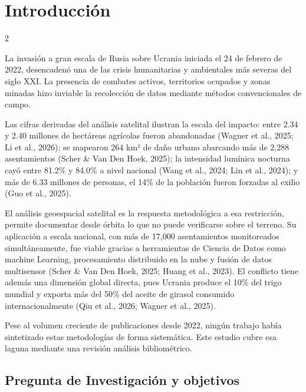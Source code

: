 \documentclass[12pt, a4paper]{article}
\begin{document}
\setcounter{page}{1}

\section{Introducción}

\begin{multicols}{2}

La invasión a gran escala de Rusia sobre Ucrania iniciada el 24 de febrero de 2022, desencadenó una de las crisis humanitarias y ambientales más severas del siglo XXI. La presencia de combates activos, territorios ocupados y zonas minadas hizo inviable la recolección de datos mediante métodos convencionales de campo.

Las cifras derivadas del análisis satelital ilustran la escala del impacto: entre 2.34 y 2.40 millones de hectáreas agrícolas fueron abandonadas (Wagner et al., 2025; Li et al., 2026); se mapearon 264 km² de daño urbano abarcando más de 2,288 asentamientos (Scher \& Van Den Hoek, 2025); la intensidad lumínica nocturna cayó entre 81.2\% y 84.0\% a nivel nacional (Wang et al., 2024; Lin et al., 2024); y más de 6.33 millones de personas, el 14\% de la población fueron forzadas al exilio (Guo et al., 2025).

El análisis geoespacial satelital es la respuesta metodológica a esa restricción, permite documentar desde órbita lo que no puede verificarse sobre el terreno. Su aplicación a escala nacional, con más de 17,000 asentamientos monitoreados simultáneamente, fue viable gracias a herramientas de Ciencia de Datos como  machine Learning, procesamiento distribuido en la nube y fusión de datos multisensor (Scher \& Van Den Hoek, 2025; Huang et al., 2023). El conflicto tiene además una dimensión global directa, pues Ucrania produce el 10\% del trigo mundial y exporta más del 50\% del aceite de girasol consumido internacionalmente (Qiu et al., 2026; Wagner et al., 2025).

Pese al volumen creciente de publicaciones desde 2022, ningún trabajo había sintetizado estas metodologías de forma sistemática. Este estudio cubre esa laguna mediante una revisión análisis bibliométrico.

\subsection{Pregunta de Investigación y objetivos}


\end{multicols}
\end{document}
